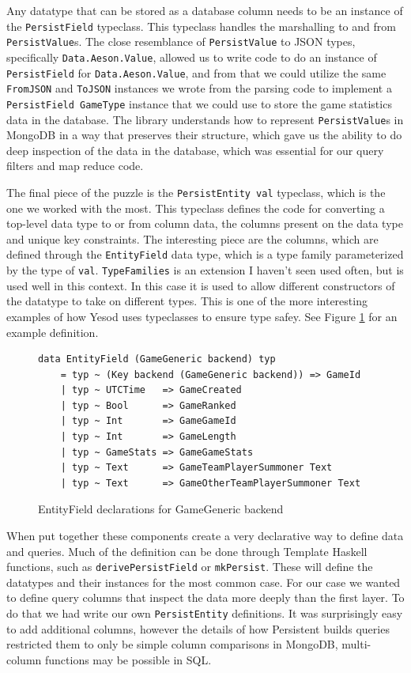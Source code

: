 \documentclass{chi2009}
\newcommand{\code}[1]{\texttt{#1}}
\begin{document}
Any datatype that can be stored as a database column needs to be an instance of the \code{PersistField} typeclass.  This typeclass handles the marshalling to and from \code{PersistValue}s.  The close resemblance of \code{PersistValue} to JSON types, specifically \code{Data.Aeson.Value}, allowed us to write code to do an instance of \code{PersistField} for \code{Data.Aeson.Value}, and from that we could utilize the same \code{FromJSON} and \code{ToJSON} instances we wrote from the parsing code to implement a \code{PersistField GameType} instance that we could use to store the game statistics data in the database.  The library understands how to represent \code{PersistValue}s in MongoDB in a way that preserves their structure, which gave us the ability to do deep inspection of the data in the database, which was essential for our query filters and map reduce code.

The final piece of the puzzle is the \code{PersistEntity val} typeclass, which is the one we worked with the most.  This typeclass defines the code for converting a top-level data type to or from column data, the columns present on the data type and unique key constraints.  The interesting piece are the columns, which are defined through the \code{EntityField} data type, which is a type family parameterized by the type of \code{val}.  \code{TypeFamilies} is an extension I haven't seen used often, but is used well in this context.  In this case it is used to allow different constructors of the datatype to take on different types.  This is one of the more interesting examples of how Yesod uses typeclasses to ensure type safey.  See Figure \ref{EntityField} for an example definition.

\begin{figure}[]
\begin{verbatim}
data EntityField (GameGeneric backend) typ
    = typ ~ (Key backend (GameGeneric backend)) => GameId 
    | typ ~ UTCTime   => GameCreated
    | typ ~ Bool      => GameRanked
    | typ ~ Int       => GameGameId
    | typ ~ Int       => GameLength
    | typ ~ GameStats => GameGameStats
    | typ ~ Text      => GameTeamPlayerSummoner Text
    | typ ~ Text      => GameOtherTeamPlayerSummoner Text
\end{verbatim}
    \caption{EntityField declarations for GameGeneric backend}
    \label{EntityField}
\end{figure}

When put together these components create a very declarative way to define data and queries.  Much of the definition can be done through Template Haskell functions, such as \code{derivePersistField} or \code{mkPersist}.  These will define the datatypes and their instances for the most common case.  For our case we wanted to define query columns that inspect the data more deeply than the first layer.  To do that we had write our own \code{PersistEntity} definitions.  It was surprisingly easy to add additional columns, however the details of how Persistent builds queries restricted them to only be simple column comparisons in MongoDB, multi-column functions may be possible in SQL.
\end{document}
